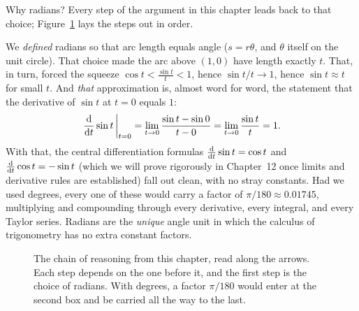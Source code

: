 Why radians? Every step of the argument in this chapter leads back to that choice; Figure~\ref{ch04:fig-radian-chain} lays the steps out in order.

We \emph{defined} radians so that arc length equals angle ($s = r\theta$, and $\theta$ itself on the unit circle). That choice made the arc above $(1,0)$ have length exactly $t$. That, in turn, forced the squeeze $\cos t < \tfrac{\sin t}{t} < 1$, hence $\sin t/t \to 1$, hence $\sin t \approx t$ for small $t$. And \emph{that} approximation is, almost word for word, the statement that the derivative of $\sin t$ at $t=0$ equals $1$:
\[
  \left.\frac{\mathrm{d} }{\mathrm{d} t}\sin t\,\right|_{t=0} = \lim_{t\to 0}\frac{\sin t - \sin 0}{t - 0} = \lim_{t\to 0}\frac{\sin t}{t} = 1.
\]
With that, the central differentiation formulas $\frac{\mathrm{d} }{\mathrm{d} t}\sin t = \cos t$ and $\frac{\mathrm{d} }{\mathrm{d} t}\cos t = -\sin t$ (which we will prove rigorously in Chapter~12 once limits and derivative rules are established) fall out clean, with no stray constants. Had we used degrees, every one of these would carry a factor of $\pi/180 \approx 0.01745$, multiplying and compounding through every derivative, every integral, and every Taylor series. Radians are the \emph{unique} angle unit in which the calculus of trigonometry has no extra constant factors.

\begin{figure}[htbp]
\centering
{}
\caption{The chain of reasoning from this chapter, read along the arrows. Each step depends on the one before it, and the first step is the choice of radians. With degrees, a factor $\pi/180$ would enter at the second box and be carried all the way to the last.}
\label{ch04:fig-radian-chain}
\end{figure}

